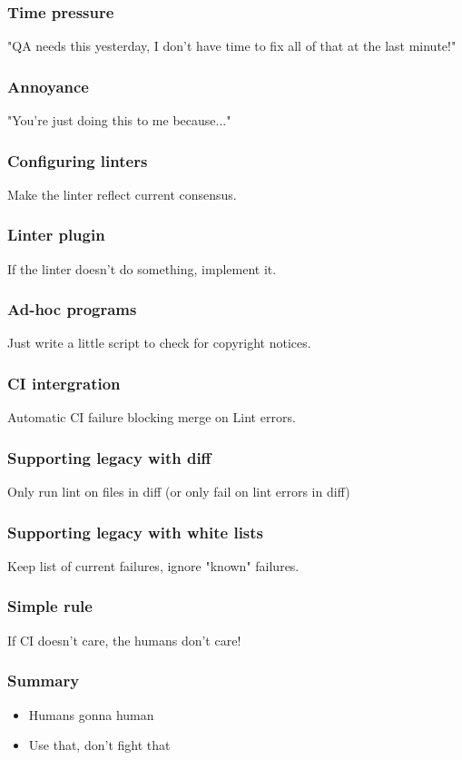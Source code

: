 \begin{frame}
\frametitle{Time pressure}
"QA needs this yesterday,
I don't have time to fix all of that at the last minute!"
\end{frame}

\begin{frame}
\frametitle{Annoyance}
"You're just doing this to me because..."
\end{frame}

\begin{frame}
\frametitle{Configuring linters}
Make the linter reflect current consensus.
\end{frame}

\begin{frame}
\frametitle{Linter plugin}
If the linter doesn't do something,
implement it.
\end{frame}

\begin{frame}
\frametitle{Ad-hoc programs}
Just write a little script to check for copyright notices.
\end{frame}

\begin{frame}
\frametitle{CI intergration}
Automatic CI failure blocking merge on Lint errors.
\end{frame}

\begin{frame}
\frametitle{Supporting legacy with diff}
Only run lint on files in diff
(or only fail on lint errors in diff)
\end{frame}

\begin{frame}
\frametitle{Supporting legacy with white lists}
Keep list of current failures,
ignore "known" failures.
\end{frame}

\begin{frame}
\frametitle{Simple rule}
If CI doesn't care,
the humans don't care!
\end{frame}

\begin{frame}
\frametitle{Summary}
\begin{itemize}
\item Humans gonna human
\item Use that, don't fight that
\end{itemize}
\end{frame}



